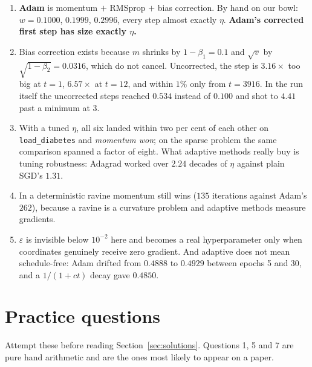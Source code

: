 \documentclass[11pt]{article}
\begin{document}
\begin{enumerate}[leftmargin=*]
    disappears. It found its own step size of $0.0124$ where a human found
    $0.005$, and multiplying the loss by $100$ changed its answer by $0.02\%$
    while SGD diverged.
    It pays with the slowest start: $0.5665$ at five epochs, worst of the six,
    though $0.4859$ by thirty.
  \item \textbf{Adam} is momentum $+$ RMSprop $+$ bias correction. By hand on
    our bowl: $w = 0.1000$, $0.1999$, $0.2996$, every step almost exactly
    $\eta$. \textbf{Adam's corrected first step has size exactly $\eta$.}
  \item Bias correction exists because $m$ shrinks by $1-\beta_1 = 0.1$ and
    $\sqrt{v}$ by $\sqrt{1-\beta_2} = 0.0316$, which do not cancel. Uncorrected,
    the step is $3.16\times$ too big at $t=1$, $6.57\times$ at $t=12$, and
    within $1\%$ only from $t=3916$. In the run itself the uncorrected steps
    reached $0.534$ instead of $0.100$ and shot to $4.41$ past a minimum at $3$.
  \item With a tuned $\eta$, all six landed within two per cent of each other on
    \texttt{load\_diabetes} and \emph{momentum won}; on the sparse problem the
    same comparison spanned a factor of eight. What adaptive methods really buy
    is tuning robustness: Adagrad worked over $2.24$ decades of $\eta$ against
    plain SGD's $1.31$.
  \item In a deterministic ravine momentum still wins ($135$ iterations against
    Adam's $262$), because a ravine is a curvature problem and adaptive methods
    measure gradients.
  \item $\varepsilon$ is invisible below $10^{-2}$ here and becomes a real
    hyperparameter only when coordinates genuinely receive zero gradient. And
    adaptive does not mean schedule-free: Adam drifted from $0.4888$ to
    $0.4929$ between epochs 5 and 30, and a $1/(1+ct)$ decay gave $0.4850$.
\end{enumerate}

\newpage
\section{Practice questions}

Attempt these before reading Section~\ref{sec:solutions}. Questions 1, 5 and 7
are pure hand arithmetic and are the ones most likely to appear on a paper.
\end{document}
